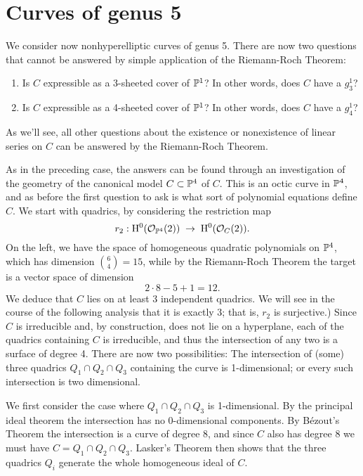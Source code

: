 

\section{Curves of genus 5}

We consider now nonhyperelliptic curves of genus 5. There are now two questions that cannot be answered by simple application of the Riemann-Roch Theorem:

\begin{enumerate}
\item Is $C$ expressible as a 3-sheeted cover of $\PP^1$? In other words, does $C$ have a $g^1_3$?
\item Is $C$ expressible as a 4-sheeted cover of $\PP^1$? In other words, does $C$ have a $g^1_4$?
\end{enumerate}

As we'll see, all other questions about the existence or nonexistence of linear series on $C$ can be answered by the Riemann-Roch Theorem.

As in the preceding case, the answers can be found through an investigation of the geometry of the canonical model $C \subset \PP^4$ of $C$. This is an octic curve in $\PP^4$, and as before the first question to ask is what sort of polynomial equations define $C$. We start with quadrics, by considering the restriction map
$$
r_2 : \HH^0(\cO_{\PP^4}(2)) \; \to \; \HH^0(\cO_{C}(2)).
$$
On the left, we have the space of homogeneous quadratic polynomials on $\PP^4$, which has dimension $\binom{6}{4} = 15$, while by the Riemann-Roch Theorem the target is a vector space of dimension
$$
2\cdot8 - 5 + 1 = 12.
$$
We deduce that $C$ lies on at least 3 independent quadrics. We will see in the course of the following analysis that it is exactly 3; that is, $r_2$ is surjective.) Since $C$ is irreducible and, by construction, does not lie on a hyperplane, each of the quadrics containing $C$ is irreducible, and thus the intersection of any two is a surface of degree 4. There are now two possibilities:  The intersection of (some) three quadrics $Q_1 \cap Q_2 \cap Q_3$ containing the curve is 1-dimensional; or every such intersection is two dimensional. 

We first consider the case where $Q_1 \cap Q_2 \cap Q_3$ is 1-dimensional. By the principal ideal theorem the intersection has no 0-dimensional components. By B\'ezout's Theorem the intersection is a curve of degree 8, and since $C$ also has degree 8 we must have $C=Q_1 \cap Q_2 \cap Q_3$. Lasker's Theorem then shows that the three quadrics $Q_i$ generate the whole homogeneous ideal of $C$.

